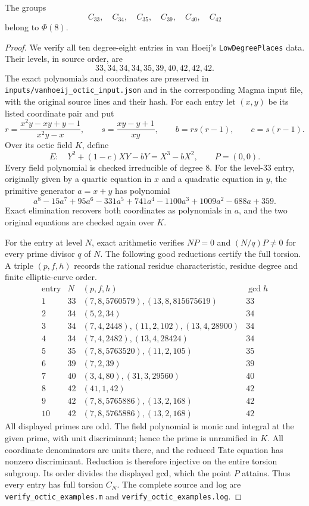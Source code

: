 \begin{proposition}\label{prop:octic-cyclic-realizations}
The groups
\[
 C_{33},\quad C_{34},\quad C_{35},\quad C_{39},\quad C_{40},\quad C_{42}
\]
belong to $\Phi(8)$.
\end{proposition}
\begin{proof}
We verify all ten degree-eight entries in van Hoeij's
\texttt{LowDegreePlaces} data. Their levels, in source order, are
\[
 33,34,34,34,35,39,40,42,42,42.
\]
The exact polynomials and coordinates are preserved in
\texttt{inputs/vanhoeij\_octic\_input.json} and in the corresponding
Magma input file, with the original source lines and their hash.
For each entry let $(x,y)$ be its listed coordinate pair and put
\[
 r=\frac{x^2y-xy+y-1}{x^2y-x},\qquad
 s=\frac{xy-y+1}{xy},\qquad b=rs(r-1),\qquad c=s(r-1).
\]
Over its octic field $K$, define
\[
 E:\quad Y^2+(1-c)XY-bY=X^3-bX^2,\qquad P=(0,0).
\]
Every field polynomial is checked irreducible of degree $8$.
For the level-$33$ entry, originally given by a quartic equation
in $x$ and a quadratic equation in $y$, the primitive generator
$a=x+y$ has polynomial
\[
 a^8-15a^7+95a^6-331a^5+741a^4-1100a^3+1009a^2-688a+359.
\]
Exact elimination recovers both coordinates as polynomials in $a$,
and the two original equations are checked again over $K$.

For the entry at level $N$, exact arithmetic verifies
$NP=0$ and $(N/q)P\ne0$ for every prime divisor $q$ of $N$.
The following good reductions certify the full torsion. A triple
$(p,f,h)$ records the rational residue characteristic, residue
degree and finite elliptic-curve order.
\[
\begin{array}{c|r|l|r}
\text{entry}&N& (p,f,h)&\gcd h\\\hline
1&33&(7,8,5760579),(13,8,815675619)&33\\
2&34&(5,2,34)&34\\
3&34&(7,4,2448),(11,2,102),(13,4,28900)&34\\
4&34&(7,4,2482),(13,4,28424)&34\\
5&35&(7,8,5763520),(11,2,105)&35\\
6&39&(7,2,39)&39\\
7&40&(3,4,80),(31,3,29560)&40\\
8&42&(41,1,42)&42\\
9&42&(7,8,5765886),(13,2,168)&42\\
10&42&(7,8,5765886),(13,2,168)&42
\end{array}
\]
All displayed primes are odd. The field polynomial is monic and
integral at the given prime, with unit discriminant; hence the
prime is unramified in $K$. All coordinate denominators are units
there, and the reduced Tate equation has nonzero discriminant.
Reduction is therefore injective on the entire torsion subgroup.
Its order divides the displayed gcd, which the point $P$ attains.
Thus every entry has full torsion $C_N$.
The complete source and log are
\texttt{verify\_octic\_examples.m} and
\texttt{verify\_octic\_examples.log}.
\end{proof}

